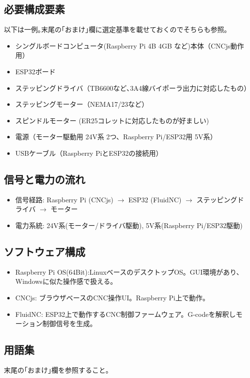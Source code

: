 \documentclass[uplatex,dvipdfmx]{ujarticle}
\begin{document}
\subsection{必要構成要素}
以下は一例｡末尾の｢おまけ｣欄に選定基準を載せておくのでそちらも参照｡
\begin{itemize}
    \item シングルボードコンピュータ(Raspberry Pi 4B 4GB など)本体（CNCjs動作用）
    \item ESP32ボード
    \item ステッピングドライバ（TB6600など､3A4線バイポーラ出力に対応したもの）
    \item ステッピングモーター（NEMA17/23など）
    \item スピンドルモーター (ER25コレットに対応したものが好ましい)    
    \item 電源（モーター駆動用 24V系 2つ、Raspberry Pi/ESP32用 5V系）
    \item USBケーブル（Raspberry PiとESP32の接続用）
\end{itemize}

\subsection{信号と電力の流れ}
\begin{itemize}
    \item 信号経路: Raspberry Pi (CNCjs) $\to$ ESP32 (FluidNC) $\to$ ステッピングドライバ $\to$ モーター
    \item 電力系統: 24V系(モーター/ドライバ駆動), 5V系(Raspberry Pi/ESP32駆動)
\end{itemize}

\subsection{ソフトウェア構成}
\begin{itemize}
    \item Raspberry Pi OS(64Bit):LinuxベースのデスクトップOS。GUI環境があり、Windowsに似た操作感で扱える｡
    \item CNCjs: ブラウザベースのCNC操作UI。Raspberry Pi上で動作。
    \item FluidNC: ESP32上で動作するCNC制御ファームウェア。G-codeを解釈しモーション制御信号を生成。
\end{itemize}

\subsection{用語集}
末尾の｢おまけ｣欄を参照すること｡
\end{document}
